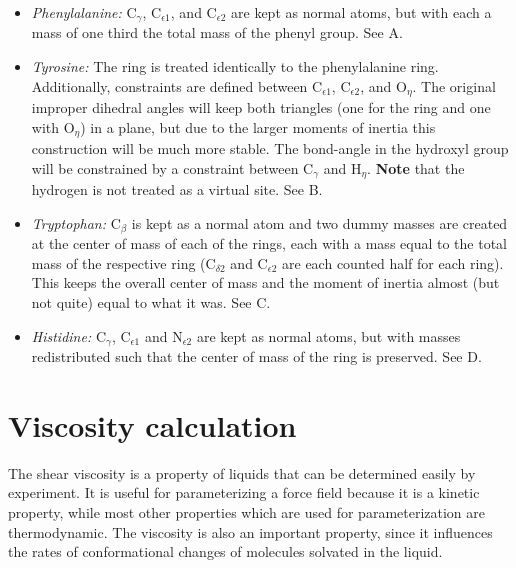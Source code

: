 \begin{itemize}

\item{\em Phenylalanine:\/} {\sf C}$_\gamma$, {\sf C}$_{{\epsilon}1}$,
and {\sf C}$_{{\epsilon}2}$ are kept as normal atoms, but with each a
mass of one third the total mass of the phenyl group. See
A.

\item{\em Tyrosine:\/} The ring is treated identically to the
phenylalanine ring. Additionally, constraints are defined between {\sf
C}$_{{\epsilon}1}$, {\sf C}$_{{\epsilon}2}$, and {\sf O}$_{\eta}$.
The original improper dihedral angles will keep both triangles (one
for the ring and one with {\sf O}$_{\eta}$) in a plane, but due to the
larger moments of inertia this construction will be much more
stable. The bond-angle in the hydroxyl group will be constrained by a
constraint between {\sf C}$_\gamma$ and {\sf H}$_{\eta}$. {\bf Note} that
the hydrogen is not treated as a virtual site. See
B.

\item{\em Tryptophan:\/} {\sf C}$_\beta$ is kept as a normal atom
and two dummy masses are created at the center of mass of each of the
rings, each with a mass equal to the total mass of the respective ring
({\sf C}$_{{\delta}2}$ and {\sf C}$_{{\epsilon}2}$ are each
counted half for each ring). This keeps the overall center of mass and
the moment of inertia almost (but not quite) equal to what it was. See
C.

\item{\em Histidine:\/} {\sf C}$_\gamma$, {\sf C}$_{{\epsilon}1}$
and {\sf N}$_{{\epsilon}2}$ are kept as normal atoms, but with masses
redistributed such that the center of mass of the ring is
preserved. See D.

\end{itemize}

\section{Viscosity calculation}

The shear viscosity is a property of liquids that can be determined easily  
by experiment. It is useful for parameterizing a force field
because it is a kinetic property, while most other properties
which are used for parameterization are thermodynamic.
The viscosity is also an important property, since it influences
the rates of conformational changes of molecules solvated in the liquid.

